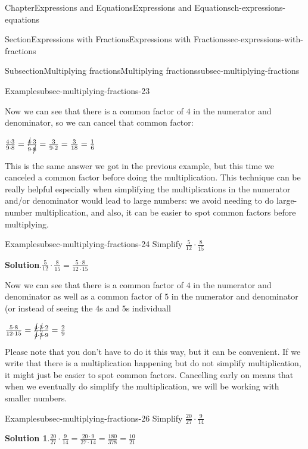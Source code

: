 \documentclass[twoside,11pt,]{book}
\newcommand{\blocktitlefont}{\relax}
\numberwithin{equation}{chapter}
\begin{document}
\begin{chapterptx}{Chapter}{Expressions and Equations}{}{Expressions and Equations}{}{}{ch-expressions-equations}
\begin{sectionptx}{Section}{Expressions with Fractions}{}{Expressions with Fractions}{}{}{sec-expressions-with-fractions}
\begin{subsectionptx}{Subsection}{Multiplying fractions}{}{Multiplying fractions}{}{}{subsec-multiplying-fractions}
\begin{example}{Example}{}{subsec-multiplying-fractions-23}
\par
Now we can see that there is a common factor of \(4\) in the numerator and denominator, so we can cancel that common factor:%
\par
\(\frac{4 \cdot 3}{9 \cdot 8} = \frac{\cancel{4} \cdot 3}{9 \cdot \cancel{8}} = \frac{3}{9 \cdot 2} = \frac{3}{18} = \frac{1}{6}\)%
\par
This is the same answer we got in the previous example, but this time we canceled a common factor before doing the multiplication. This technique can be really helpful especially when simplifying the multiplications in the numerator and\slash{}or denominator would lead to large numbers: we avoid needing to do large-number multiplication, and also, it can be easier to spot common factors before multiplying.%
\end{example}
\begin{example}{Example}{}{subsec-multiplying-fractions-24}%
Simplify \(\frac{5}{12} \cdot \frac{8}{15}\)%
\par\smallskip%
\noindent\textbf{\blocktitlefont Solution}.\hypertarget{subsec-multiplying-fractions-24-2}{}\quad{}\(\frac{5}{12} \cdot \frac{8}{15} = \frac{5 \cdot 8}{12 \cdot 15}\)%
\par
Now we can see that there is a common factor of \(4\) in the numerator and denominator as well as a common factor of \(5\) in the numerator and denominator (or instead of seeing the \(4\)s and \(5\)s individuall%
\par
\(\frac{5 \cdot 8}{12 \cdot 15} = \frac{\cancel{4} \cdot \cancel{5} \cdot 2}{\cancel{4} \cdot \cancel{5} \cdot 9} = \frac{2}{9}\)%
\end{example}
Please note that you don't have to do it this way, but it can be convenient. If we write that there is a multiplication happening but do not simplify multiplication, it might just be easier to spot common factors. Cancelling early on means that when we eventually do simplify the multiplication, we will be working with smaller numbers.%
\begin{example}{Example}{}{subsec-multiplying-fractions-26}%
Simplify \(\frac{20}{27} \cdot \frac{9}{14}\)%
\par\smallskip%
\noindent\textbf{\blocktitlefont Solution 1}.\hypertarget{subsec-multiplying-fractions-26-2}{}\quad{}\(\frac{20}{27} \cdot \frac{9}{14} = \frac{20 \cdot 9}{27 \cdot 14} = \frac{180}{378} = \frac{10}{21}\)%
\par

\end{example}
\end{subsectionptx}
\end{sectionptx}
\end{chapterptx}
\end{document}
